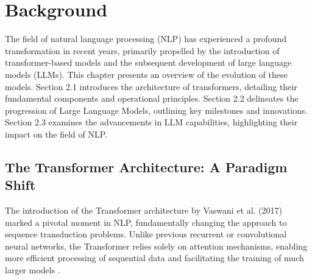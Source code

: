 \documentclass[logo,msc]{infthesis}           %
\begin{document}




\chapter{Background}


The field of natural language processing (NLP) has experienced a profound transformation in recent years, primarily propelled by the introduction of transformer-based models and the subsequent development of large language models (LLMs). This chapter presents an overview of the evolution of these models. Section 2.1 introduces the architecture of transformers, detailing their fundamental components and operational principles. Section 2.2 delineates the progression of Large Language Models, outlining key milestones and innovations. Section 2.3 examines the advancements in LLM capabilities, highlighting their impact on the field of NLP.


\section{The Transformer Architecture: A Paradigm Shift}
The introduction of the Transformer architecture by Vaswani et al. (2017) marked a pivotal moment in NLP, fundamentally changing the approach to sequence transduction problems. Unlike previous recurrent or convolutional neural networks, the Transformer relies solely on attention mechanisms, enabling more efficient processing of sequential data and facilitating the training of much larger models \cite{vaswani2023attentionneed}.
\end{document}
